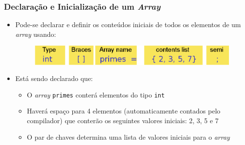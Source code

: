 \documentclass[xcolor={dvipsnames,table},aspectratio=169]{beamer}
\begin{document}
\begin{frame}\frametitle{Declaração e Inicialização de um \emph{Array}}
\begin{itemize}
	\item Pode-se declarar e definir os conteúdos iniciais de todos os elementos de um \emph{array} usando:
\begin{figure}[h]
	\includegraphics[height=0.10\paperheight,center]{pucrs-ep-fprog-unidade_06-arrays-laminas-declaracao_e_inicializacao.png}
\end{figure}
	\item Está sendo declarado que:
	\begin{itemize}
		\item O \emph{array} \texttt{primes} conterá elementos do tipo \texttt{int}
		\item Haverá espaço para 4 elementos (automaticamente contados pelo compilador) que conterão os seguintes valores iniciais: 2, 3, 5 e 7
		\item O par de chaves determina uma lista de valores iniciais para o \emph{array}
	\end{itemize}
\end{itemize}
\end{frame}
\end{document}

